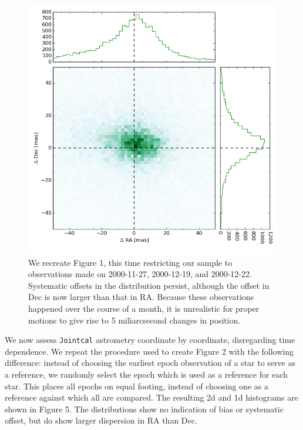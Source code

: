 \documentclass[modern]{aastex61}
\begin{document}
\begin{figure}[ht!]
    \includegraphics[width=.9\textwidth]{ra_dec_20001127_20001219_20001222.png}
    \caption{We recreate Figure 1, this time restricting our sample to observations made on 2000-11-27, 2000-12-19, and 2000-12-22. Systematic offsets in the distribution persist, although the offset in Dec is now larger than that in RA. Because these observations happened over the course of a month, it is unrealistic for proper motions to give rise to 5 miliarcsecond changes in position.}
\end{figure}

We now assess {\tt\string Jointcal} astrometry coordinate by coordinate, disregarding time dependence. We repeat the procedure used to create Figure 2 with the following difference: instead of choosing the earliest epoch observation of a star to serve as a reference, we randomly select the epoch which is used as a reference for each star. This places all epochs on equal footing, instead of choosing one as a reference against which all are compared. The resulting 2d and 1d histograms are shown in Figure 5. The distributions show no indication of bias or systematic offset, but do show larger dispersion in RA than Dec. 
\end{document}
